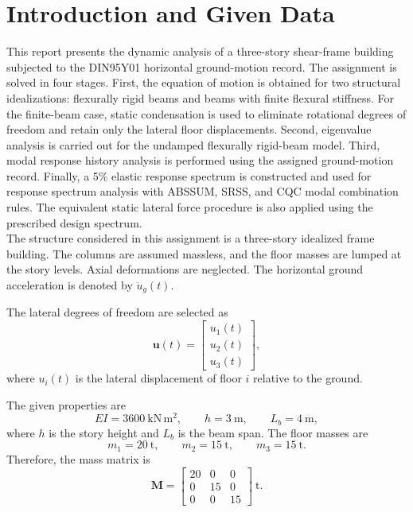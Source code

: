 \documentclass[11pt,a4paper]{article}
\begin{document}
\tableofcontents
\pagebreak
\section{Introduction and Given Data}

This report presents the dynamic analysis of a three-story shear-frame building subjected to the DIN95Y01 horizontal ground-motion record. The assignment is solved in four stages. First, the equation of motion is obtained for two structural idealizations: flexurally rigid beams and beams with finite flexural stiffness. For the finite-beam case, static condensation is used to eliminate rotational degrees of freedom and retain only the lateral floor displacements. Second, eigenvalue analysis is carried out for the undamped flexurally rigid-beam model. Third, modal response history analysis is performed using the assigned ground-motion record. Finally, a 5\% elastic response spectrum is constructed and used for response spectrum analysis with ABSSUM, SRSS, and CQC modal combination rules. The equivalent static lateral force procedure is also applied using the prescribed design spectrum. \\
The structure considered in this assignment is a three-story idealized frame building. The columns are assumed massless, and the floor masses are lumped at the story levels. Axial deformations are neglected. The horizontal ground acceleration is denoted by $\ddot{u}_g(t)$.

The lateral degrees of freedom are selected as
\begin{equation}
\bm{u}(t)=
\begin{bmatrix}
 u_1(t)\\
 u_2(t)\\
 u_3(t)
\end{bmatrix},
\end{equation}
where $u_i(t)$ is the lateral displacement of floor $i$ relative to the ground.

The given properties are
\begin{equation}
EI=3600\ \mathrm{kN\,m^2},
\qquad h=3\ \mathrm{m},
\qquad L_b=4\ \mathrm{m},
\end{equation}
where $h$ is the story height and $L_b$ is the beam span. The floor masses are
\begin{equation}
 m_1=20\ \mathrm{t},\qquad m_2=15\ \mathrm{t},\qquad m_3=15\ \mathrm{t}.
\end{equation}
Therefore, the mass matrix is
\begin{equation}
\bm{M}=\begin{bmatrix}
20&0&0\\
0&15&0\\
0&0&15
\end{bmatrix}\ \mathrm{t}.
\end{equation}
\end{document}
